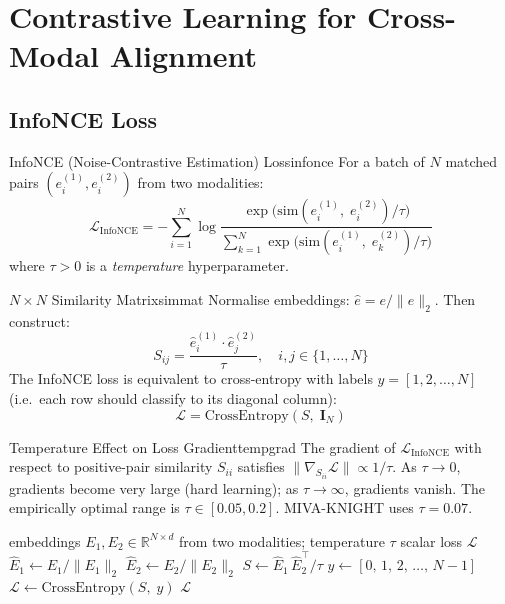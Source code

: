 \documentclass[12pt,a4paper]{article}
\newcommand{\R}{\mathbb{R}}
\begin{document}
\section{Contrastive Learning for Cross-Modal Alignment}

\subsection{InfoNCE Loss}

\begin{definition}{InfoNCE (Noise-Contrastive Estimation) Loss}{infonce}
For a batch of $N$ matched pairs $(e_i^{(1)}, e_i^{(2)})$ from two modalities:
\[
  \mathcal{L}_{\text{InfoNCE}}
  = -\sum_{i=1}^{N} \log
    \frac{\exp\!\bigl(\text{sim}(e_i^{(1)},\;e_i^{(2)})/\tau\bigr)}
         {\sum_{k=1}^{N}\exp\!\bigl(\text{sim}(e_i^{(1)},\;e_k^{(2)})/\tau\bigr)}
\]
where $\tau > 0$ is a \emph{temperature} hyperparameter.
\end{definition}

\begin{definition}{$N\times N$ Similarity Matrix}{simmat}
Normalise embeddings: $\hat{e} = e/\|e\|_2$.
Then construct:
\[
  S_{ij} = \frac{\hat{e}_i^{(1)} \cdot \hat{e}_j^{(2)}}{\tau},
  \quad i,j \in \{1,\ldots,N\}
\]
The InfoNCE loss is equivalent to cross-entropy with labels $y = [1, 2, \ldots, N]$
(i.e.\ each row should classify to its diagonal column):
\[
  \mathcal{L} = \text{CrossEntropy}(S,\; \mathbf{I}_N)
\]
\end{definition}

\begin{lemma}{Temperature Effect on Loss Gradient}{tempgrad}
The gradient of $\mathcal{L}_{\text{InfoNCE}}$ with respect to positive-pair
similarity $S_{ii}$ satisfies $\|\nabla_{S_{ii}}\mathcal{L}\| \propto 1/\tau$.
As $\tau \to 0$, gradients become very large (hard learning); as $\tau \to \infty$,
gradients vanish. The empirically optimal range is $\tau \in [0.05, 0.2]$.
MIVA-KNIGHT uses $\tau = 0.07$.
\end{lemma}

\begin{algorithm}[H]
\caption{Contrastive Loss (InfoNCE)}
\label{alg:contrastive}
\begin{algorithmic}[1]
\Require embeddings $E_1, E_2 \in \R^{N \times d}$ from two modalities; temperature $\tau$
\Ensure scalar loss $\mathcal{L}$
\State $\hat{E}_1 \leftarrow E_1 / \|E_1\|_2$  
\State $\hat{E}_2 \leftarrow E_2 / \|E_2\|_2$
\State $S \leftarrow \hat{E}_1\,\hat{E}_2^\top / \tau$  
\State $y \leftarrow [0,\,1,\,2,\,\ldots,\,N-1]$  
\State $\mathcal{L} \leftarrow \text{CrossEntropy}(S,\; y)$
\State \Return $\mathcal{L}$
\end{algorithmic}
\end{algorithm}
\end{document}

